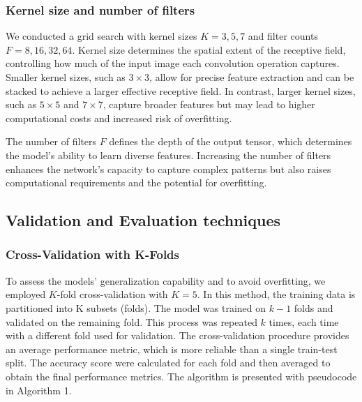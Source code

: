 \subsubsection{Kernel size and number of filters}

We conducted a grid search with kernel sizes $K = {3, 5, 7}$ and filter counts $F = {8, 16, 32, 64}$. Kernel size determines the spatial extent of the receptive field, controlling how much of the input image each convolution operation captures. Smaller kernel sizes, such as $3\times3$, allow for precise feature extraction and can be stacked to achieve a larger effective receptive field. In contrast, larger kernel sizes, such as $5\times5$ and $7\times7$, capture broader features but may lead to higher computational costs and increased risk of overfitting.

The number of filters $F$ defines the depth of the output tensor, which determines the model's ability to learn diverse features. Increasing the number of filters enhances the network's capacity to capture complex patterns but also raises computational requirements and the potential for overfitting.

\subsection{Validation and Evaluation techniques}

\subsubsection{Cross-Validation with K-Folds}

To assess the models' generalization capability and to avoid overfitting, we employed $K$-fold cross-validation with $K = 5$. In this method, the training data is partitioned into K subsets (folds). The model was trained on $k-1$ folds and validated on the remaining fold. This process was repeated $k$ times, each time with a different fold used for validation. The cross-validation procedure provides an average performance metric, which is more reliable than a single train-test split. The accuracy score were calculated for each fold and then averaged to obtain the final performance metrics. The algorithm is presented with pseudocode in Algorithm 1.


